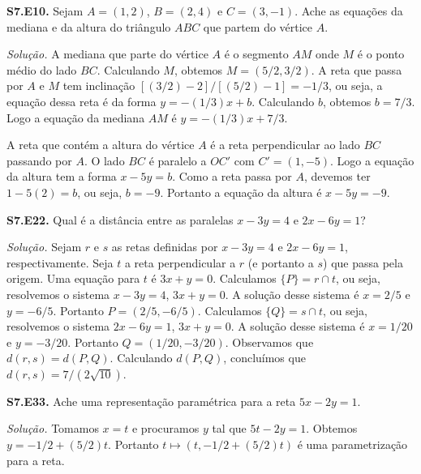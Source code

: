 \documentclass[a4paper,11pt]{article}
\begin{document}
\textbf{S7.E10.}
Sejam $A = (1,2)$, $B = (2,4)$ e $C = (3,-1)$.
Ache as equações da mediana e da altura do triângulo $ABC$ que partem do vértice $A$.

\vspace{\baselineskip}

\emph{Solução.}
A mediana que parte do vértice $A$ é o segmento $AM$ onde $M$ é o ponto médio do lado $BC$.
Calculando $M$, obtemos $M = (5/2,3/2)$.
A reta que passa por $A$ e $M$ tem inclinação $[(3/2)-2]/[(5/2)-1] = -1/3$, ou seja, a equação dessa reta é da forma $y = -(1/3)x + b$.
Calculando $b$, obtemos $b = 7/3$.
Logo a equação da mediana $AM$ é $y = -(1/3)x + 7/3$.

A reta que contém a altura do vértice $A$ é a reta perpendicular ao lado $BC$ passando por $A$.
O lado $BC$ é paralelo a $OC'$ com $C' = (1,-5)$.
Logo a equação da altura tem a forma $x - 5y = b$.
Como a reta passa por $A$, devemos ter $1-5(2) = b$, ou seja, $b = -9$.
Portanto a equação da altura é $x - 5y = -9$.

\vspace{\baselineskip}

\textbf{S7.E22.}
Qual é a distância entre as paralelas $x - 3y = 4$ e $2x - 6y = 1$?

\vspace{\baselineskip}

\emph{Solução.}
Sejam $r$ e $s$ as retas definidas por $x - 3y = 4$ e $2x - 6y = 1$, respectivamente.
Seja $t$ a reta perpendicular a $r$ (e portanto a $s$) que passa pela origem.
Uma equação para $t$ é $3x + y = 0$.
Calculamos $\{P\} = r \cap t$, ou seja, resolvemos o sistema $x-3y = 4$, $3x + y = 0$.
A solução desse sistema é $x = 2/5$ e $y = -6/5$.
Portanto $P = (2/5, -6/5)$.
Calculamos $\{Q\} = s \cap t$, ou seja, resolvemos o sistema $2x - 6y = 1$, $3x + y = 0$.
A solução desse sistema é $x = 1/20$ e $y = -3/20$.
Portanto $Q = (1/20, -3/20)$.
Observamos que $d(r,s) = d(P,Q)$.
Calculando $d(P,Q)$, concluímos que
$d(r,s) = 7/(2 \sqrt{10})$.

\vspace{\baselineskip}

\textbf{S7.E33.}
Ache uma representação paramétrica para a reta $5x - 2y = 1$.

\vspace{\baselineskip}

\emph{Solução.}
Tomamos $x = t$ e procuramos $y$ tal que $5t - 2y = 1$.
Obtemos $y = -1/2 + (5/2)t$.
Portanto $t \mapsto (t, -1/2 + (5/2)t)$ é uma parametrização para a reta.
\end{document}
